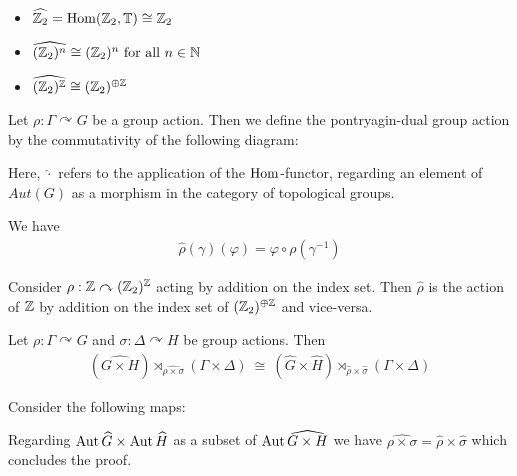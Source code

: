 \begin{Example}
	\label{the_zero_divisor_problem:pontryagin_duality:example_duals}
	\
	\begin{itemize}
		\item {$\widehat{\mathbb{Z}_2} = \operatorname{Hom}(\mathbb{Z}_2,\mathbb{T}) \cong \mathbb{Z}_2$}
		\item {$\widehat{(\mathbb{Z}_2)^n} \cong (\mathbb{Z}_2)^n ~\text{for all}~ n \in \mathbb{N}$}
		\item {$\widehat{(\mathbb{Z}_2)^{\mathbb{Z}}} \cong (\mathbb{Z}_2)^{\oplus \mathbb{Z}}$}
	\end{itemize}
\end{Example}

\begin{Definition}
	Let $\rho: \Gamma \curvearrowright G$ be a group action.
	Then we define the {pontryagin-dual group action} by the commutativity of the following diagram:
	\begin{figure}[H]
		\centering
		
	\end{figure}
	Here, $\widehat{\cdot}$ refers to the application of the $\operatorname{Hom}$-functor, regarding an element of $Aut(G)$ as a morphism in the category of topological groups.
\end{Definition}
\begin{Remark}
	We have
	\begin{align*}
		\widehat{\rho}(\gamma)(\varphi) = \varphi \circ \rho(\gamma^{-1})
	\end{align*}
\end{Remark}
\begin{Example}
	\label{the_zero_divisor_problem:pontryagin_duality:example_dual_action}
	Consider $\rho: \mathbb{Z} \curvearrowright (\mathbb{Z}_2)^{\mathbb{Z}}$ acting by addition on the index set.
	Then $\widehat{\rho}$ is the action of $\mathbb{Z}$ by addition on the index set of $(\mathbb{Z}_2)^{\oplus \mathbb{Z}}$ and vice-versa.
\end{Example}

\begin{Lemma}
	\label{the_zero_divisor_problem:pontryagin_duality:lemma_product_of_dual_group_actions}
	Let $\rho: \Gamma \curvearrowright G$ and $\sigma: \Delta \curvearrowright H$ be group actions. Then
	\begin{align*}
		(\widehat{G \times H}) \rtimes_{\widehat{\rho \times \sigma}} (\Gamma \times \Delta) ~\cong~ (\widehat{G} \times \widehat{H}) \rtimes_{\widehat{\rho} \times \widehat{\sigma}} (\Gamma \times \Delta)
	\end{align*}
\end{Lemma}

\proof
	Consider the following maps:
	\begin{figure}[H]
		\centering
		
	\end{figure}
	Regarding $\operatorname{Aut}{\widehat{G}} \times \operatorname{Aut}{\widehat{H}}$ as a subset of $\operatorname{Aut} \widehat{G \times H}$ we have $\widehat{\rho \times \sigma} = \widehat{\rho} \times \widehat{\sigma}$ which concludes the proof.
\endproof


